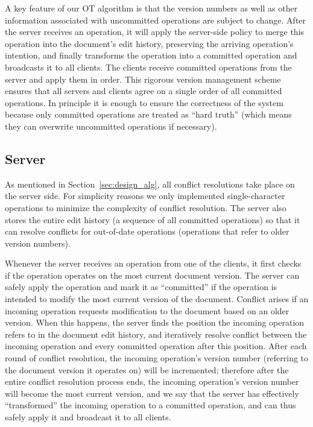 A key feature of our OT algorithm is that the version numbers as well as other
information associated with uncommitted operations are subject to change. After
the server receives an operation, it will apply the server-side policy to merge
this operation into the document's edit history, preserving the arriving
operation's intention, and finally transforms the operation into a committed
operation and broadcasts it to all clients. The clients receive committed
operations from the server and apply them in order. This rigorous version
management scheme ensures that all servers and clients agree on a single order
of all committed operations. In principle it is enough to ensure the correctness
of the system because only committed operations are treated as ``hard truth''
(which means they can overwrite uncommitted operations if necessary).

\subsection{Server}
\label{sec:design_server}

As mentioned in Section~\ref{sec:design_alg}, all conflict resolutions take place
on the server side. For simplicity reasons we only implemented single-character
operations to minimize the complexity of conflict resolution. The server also
stores the entire edit history (a sequence of all committed operations) so that
it can resolve conflicts for out-of-date operations (operations that refer to
older version numbers).

Whenever the server receives an operation from one of the clients, it first
checks if the operation operates on the most current document version. The
server can safely apply the operation and mark it as ``committed'' if the
operation is intended to modify the most current version of the document.
Conflict arises if an incoming operation requests modification to the document
based on an older version. When this happens, the server finds the position the
incoming operation refers to in the document edit history, and iteratively
resolve conflict between the incoming operation and every committed operation
after this position. After each round of conflict resolution, the incoming
operation's version number (referring to the document version it operates on)
will be incremented; therefore after the entire conflict resolution process
ends, the incoming operation's version number will become the most current
version, and we say that the server has effectively ``transformed'' the incoming
operation to a committed operation, and can thus safely apply it and broadcast
it to all clients.

